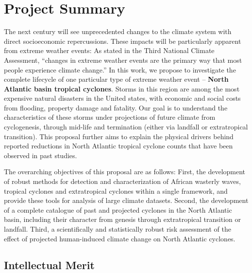 \documentclass[11pt]{article}
\begin{document}
\appendix

\addtocounter{section}{1}

\section{Project Summary}
\vspace{-0.2cm}

The next century will see unprecedented changes to the climate system with direct socioeconomic repercussions.  These impacts will be particularly apparent from extreme weather events: As stated in the Third National Climate Assessment, ``changes in extreme weather events are the primary way that most people experience climate change.''  In this work, we propose to investigate the complete lifecycle of one particular type of extreme weather event -- \textbf{North Atlantic basin tropical cyclones}.  Storms in this region are among the most expensive natural disasters in the United states, with economic and social costs from flooding, property damage and fatality.  Our goal is to understand the characteristics of these storms under projections of future climate from cyclogenesis, through mid-life and termination (either via landfall or extratropical transition).  This proposal further aims to explain the physical drivers behind reported reductions in North Atlantic tropical cyclone counts that have been observed in past studies.

The overarching objectives of this proposal are as follows:  First, the development of robust methods for detection and characterization of African wasterly waves, tropical cyclones and extratropical cyclones within a single framework, and provide these tools for analysis of large climate datasets.  Second, the development of a complete catalogue of past and projected cyclones in the North Atlantic basin, including their character from genesis through extratropical transition or landfall.  Third, a scientifically and statistically robust risk assessment of the effect of projected human-induced climate change on North Atlantic cyclones.

\vspace{-0.7cm}
\subsection*{Intellectual Merit}
\vspace{-0.6cm}
\end{document}
